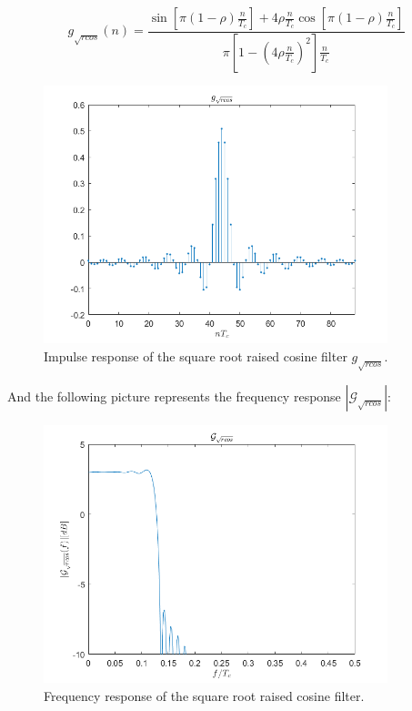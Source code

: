 \documentclass[a4paper,11.5pt]{article}
\begin{document}
\begin{equation}\label{eq:g_rcos}
g_{\sqrt{rcos}}(n) = \frac{\sin\left[\pi\left(1 - \rho\right)\frac{n}{T_c}\right] + 4\rho\frac{n}{T_c}\cos\left[\pi\left(1 - \rho\right)\frac{n}{T_c}\right]}{\pi\left[1-\left(4\rho\frac{n}{T_c}\right)^2\right]\frac{n}{T_c}}
\end{equation}


\begin{figure}[H]
	\begin{center}   
		\includegraphics[width=10cm]{figs/gimp_rcos.png} 
		\caption{Impulse response of the square root raised cosine filter $g_{\sqrt{rcos}}$.}
		\label{fig:gimp_rcos}
	\end{center}
\end{figure}

And the following picture represents the frequency response $|\mathcal{G}_{\sqrt{rcos}}|$:

\begin{figure}[H]
	\begin{center}   
		\includegraphics[width=10cm]{figs/G_rcos.png} 
		\caption{Frequency response of the square root raised cosine filter.}
		\label{fig:Grcos}
	\end{center}
\end{figure}
\end{document}
